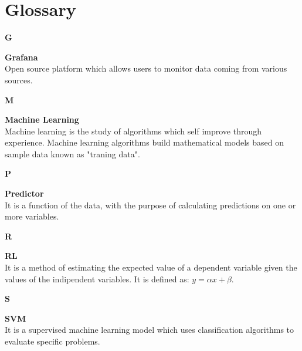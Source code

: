 \section{Glossary}

{\Large\textbf{G}\par}
\textbf{Grafana} \\
Open source platform which allows users to monitor data coming from various sources.

{\Large\textbf{M}\par}
\textbf{Machine Learning} \\
Machine learning is the study of algorithms which self improve through experience. Machine learning algorithms build mathematical models based on sample data known as "traning data". 

{\Large\textbf{P}\par}
\textbf{Predictor} \\
It is a function of the data, with the purpose of calculating predictions on one or more variables.

{\Large\textbf{R}\par}
\textbf{RL} \\
It is a method of estimating the expected value of a dependent variable given the values of the indipendent variables. 
It is defined as: $y = \alpha x + \beta $.

{\Large\textbf{S}\par}
\textbf{SVM} \\
It is a supervised machine learning model which uses classification algorithms to evaluate specific problems.